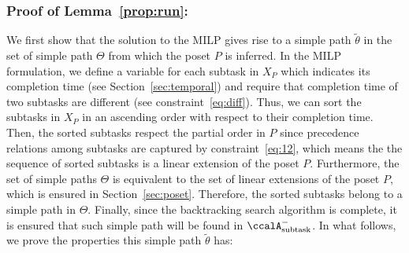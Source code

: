 \documentclass[Afour,sageh,times]{sagej}
\newcommand{\auto}[1]{\ccalA_{\textup{#1}}}
\begin{document}
{{%

\subsubsection{Proof of Lemma~\ref{prop:run}:}\label{app:run}
We first show that the solution to the MILP gives rise to a simple path $\tilde{\theta}$ in the set of simple path $\Theta$ from which the poset $P$ is inferred. In the MILP formulation, we define a variable for each subtask in $X_P$ which indicates its completion time (see Section~\ref{sec:temporal}) and require that completion time of two subtasks are different (see constraint~\eqref{eq:diff}).  Thus, we can sort the subtasks in $X_P$  in an ascending order with respect to their completion time. Then, the sorted subtasks respect the partial order in $P$ since precedence relations among subtasks are captured by constraint~\eqref{eq:12}, which means the the sequence  of sorted subtasks is a linear extension of the poset $P$. Furthermore, the set of simple paths $\Theta$ is equivalent to the set of  linear extensions of the poset $P$, which is ensured in Section~\ref{sec:poset}. Therefore, the sorted subtasks belong to a simple path in $\Theta$. Finally, since the  backtracking search algorithm is complete, it is ensured that such simple path will be found in $\auto{subtask}^-$. In what follows, we prove the properties this simple path $\tilde{\theta}$ has:

}}
\end{document}
